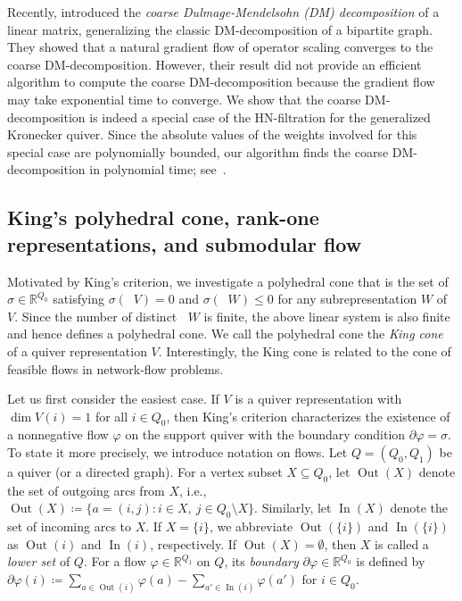 \documentclass[a4paper,11pt]{article}
\numberwithin{equation}{section}
\newcommand{\R}{\mathbb{R}}
\DeclareMathOperator{\In}{In}
\DeclareMathOperator{\Out}{Out}
\DeclareMathOperator{\dimv}{\underline{dim}}
\begin{document}
Recently, \citet{Hirai2024} introduced the \emph{coarse Dulmage-Mendelsohn (DM) decomposition} of a linear matrix, generalizing the classic DM-decomposition of a bipartite graph.
They showed that a natural gradient flow of operator scaling converges to the coarse DM-decomposition.
However, their result did not provide an efficient algorithm to compute the coarse DM-decomposition because the gradient flow may take exponential time to converge.
We show that the coarse DM-decomposition is indeed a special case of the HN-filtration for the generalized Kronecker quiver.
Since the absolute values of the weights involved for this special case are polynomially bounded, our algorithm finds the coarse DM-decomposition in polynomial time; see~.

\subsection{King's polyhedral cone, rank-one representations, and submodular flow}\label{subsec:Intro:rank-one}






Motivated by King's criterion, we investigate a polyhedral cone that is the set of $\sigma \in \R^{Q_0}$ satisfying $\sigma(\dimv V) = 0$ and $\sigma(\dimv W) \leq 0$ for any subrepresentation $W$ of $V$.
Since the number of distinct $\dimv W$ is finite, the above linear system is also finite and hence defines a polyhedral cone.
We call the polyhedral cone the \emph{King cone} of a quiver representation $V$.
Interestingly, the King cone is related to the cone of feasible flows in network-flow problems.

Let us first consider the easiest case.
If $V$ is a quiver representation with $\dim V(i) = 1$ for all $i \in Q_0$, then
King's criterion characterizes the existence of a nonnegative flow $\varphi$ on the support quiver with the boundary condition $\partial \varphi = \sigma$.
To state it more precisely,
we introduce notation on flows.
Let $Q = (Q_0, Q_1)$ be a quiver (or a directed graph).
For a vertex subset $X \subseteq Q_0$,
let $\Out(X)$ denote the set of outgoing arcs from $X$, i.e., $\Out(X) \coloneqq \{ a = (i,j) : i \in X,\ j \in Q_0 \setminus X \}$.
Similarly, let $\In(X)$ denote the set of incoming arcs to $X$.
If $X = \{i\}$, we abbreviate $\Out(\{i\})$ and $\In(\{i\})$ as $\Out(i)$ and $\In(i)$, respectively.
If $\Out(X) = \emptyset$, then $X$ is called a \emph{lower set} of $Q$.
For a flow $\varphi \in \R^{Q_1}$ on $Q$,
its \emph{boundary} $\partial \varphi \in \R^{Q_0}$ is defined by $\partial \varphi(i) \coloneqq \sum_{a \in \Out(i)} \varphi(a) - \sum_{a' \in \In(i)} \varphi(a')$ for $i \in Q_0$.
\end{document}
